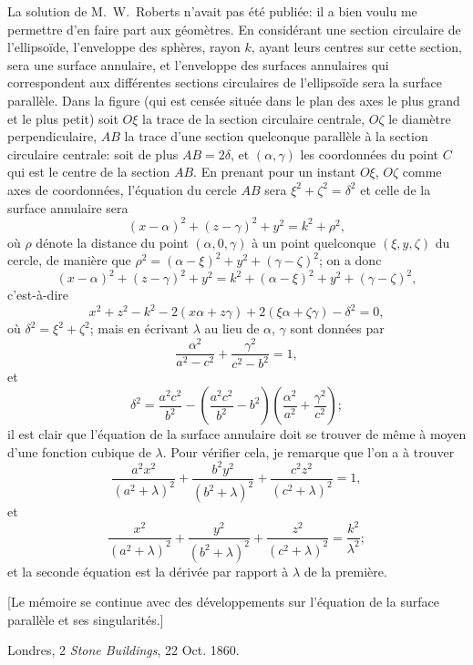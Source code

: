 \documentclass[11pt,a4paper]{book}
\begin{document}
La solution de M.~W.~Roberts n'avait pas \'{e}t\'{e} publi\'{e}e: il a bien voulu me permettre d'en faire part aux g\'{e}om\`{e}tres. En consid\'{e}rant une section circulaire de l'ellipso\"{i}de, l'enveloppe des sph\`{e}res, rayon $k$, ayant leurs centres sur cette section, sera une surface annulaire, et l'enveloppe des surfaces annulaires qui correspondent aux diff\'{e}rentes sections circulaires de l'ellipso\"{i}de sera la surface parall\`{e}le. Dans la figure (qui est cens\'{e}e situ\'{e}e dans le plan des axes le plus grand et le plus petit) soit $O\xi$ la trace de la section circulaire centrale, $O\zeta$ le diam\`{e}tre perpendiculaire, $AB$ la trace d'une section quelconque parall\`{e}le \`{a} la section circulaire centrale: soit de plus $AB = 2\delta$, et $(\alpha, \gamma)$ les coordonn\'{e}es du point $C$ qui est le centre de la section $AB$. En prenant pour un instant $O\xi$, $O\zeta$ comme axes de coordonn\'{e}es, l'\'{e}quation du cercle $AB$ sera $\xi^2 + \zeta^2 = \delta^2$ et celle de la surface annulaire sera
\[
(x-\alpha)^2 + (z-\gamma)^2 + y^2 = k^2 + \rho^2,
\]
o\`{u} $\rho$ d\'{e}note la distance du point $(\alpha, 0, \gamma)$ \`{a} un point quelconque $(\xi, y, \zeta)$ du cercle, de mani\`{e}re que $\rho^2 = (\alpha-\xi)^2 + y^2 + (\gamma-\zeta)^2$; on a donc
\[
(x-\alpha)^2 + (z-\gamma)^2 + y^2 = k^2 + (\alpha-\xi)^2 + y^2 + (\gamma-\zeta)^2,
\]
c'est-\`{a}-dire
\[
x^2 + z^2 - k^2 - 2(x\alpha + z\gamma) + 2(\xi\alpha + \zeta\gamma) - \delta^2 = 0,
\]
o\`{u} $\delta^2 = \xi^2 + \zeta^2$; mais en \'{e}crivant $\lambda$ au lieu de $\alpha$, $\gamma$ sont donn\'{e}es par
\[
\frac{\alpha^2}{a^2-c^2} + \frac{\gamma^2}{c^2-b^2} = 1,
\]
et
\[
\delta^2 = \frac{a^2c^2}{b^2} - \left(\frac{a^2c^2}{b^2} - b^2\right)\left(\frac{\alpha^2}{a^2} + \frac{\gamma^2}{c^2}\right);
\]
il est clair que l'\'{e}quation de la surface annulaire doit se trouver de m\^{e}me \`{a} moyen d'une fonction cubique de $\lambda$. Pour v\'{e}rifier cela, je remarque que l'on a \`{a} trouver
\[
\frac{a^2x^2}{(a^2+\lambda)^2} + \frac{b^2y^2}{(b^2+\lambda)^2} + \frac{c^2z^2}{(c^2+\lambda)^2} = 1,
\]
et
\[
\frac{x^2}{(a^2+\lambda)^2} + \frac{y^2}{(b^2+\lambda)^2} + \frac{z^2}{(c^2+\lambda)^2} = \frac{k^2}{\lambda^2};
\]
et la seconde \'{e}quation est la d\'{e}riv\'{e}e par rapport \`{a} $\lambda$ de la premi\`{e}re.

[Le m\'{e}moire se continue avec des d\'{e}veloppements sur l'\'{e}quation de la surface parall\`{e}le et ses singularit\'{e}s.]

\begin{flushright}
Londres, 2 \textit{Stone Buildings}, 22 Oct. 1860.
\end{flushright}
\end{document}
